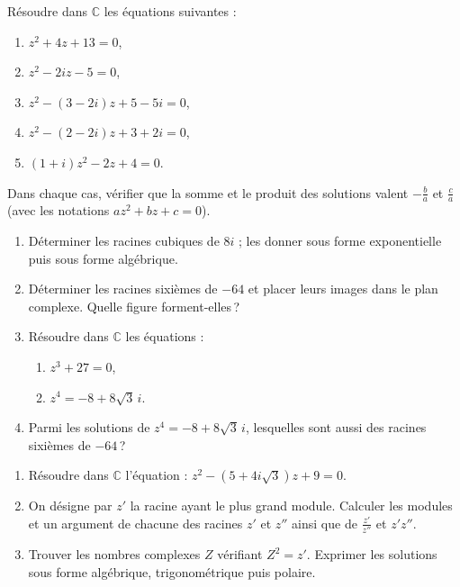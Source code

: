 \begin{exo}
	R\'esoudre dans $\mathbb{C}$ les \'equations suivantes :
	\begin{enumerate}
		\item $z^2 + 4z + 13 = 0$,
		\item $z^2 - 2iz - 5 = 0$,
		\item $z^2 - (3 - 2i) z + 5 - 5i = 0$,
		\item $z^2 - (2 - 2i) z + 3 + 2i = 0$,
		\item $(1+i) z^2 - 2z + 4 = 0$.
	\end{enumerate}
	Dans chaque cas, v\'erifier que la somme et le produit des solutions valent $-\frac{b}{a}$ et $\frac{c}{a}$ (avec les notations $az^2 + bz + c = 0$).
\end{exo}
%
\begin{exo}
	\begin{enumerate}
		\item D\'eterminer les racines cubiques de $8i$ ; les donner sous forme exponentielle puis sous forme alg\'ebrique.
		\item D\'eterminer les racines sixi\`emes de $-64$ et placer leurs images dans le plan complexe.
		      Quelle figure forment-elles\,?
		\item R\'esoudre dans $\mathbb{C}$ les \'equations :
			\begin{enumerate}
				\item $z^3 + 27 = 0$,
				\item $z^4 = -8 + 8\sqrt{3}\, i$.
			\end{enumerate}
		\item Parmi les solutions de $z^4 = -8 + 8\sqrt{3}\, i$, lesquelles sont aussi des racines sixi\`emes de $-64$\,?
	\end{enumerate}
\end{exo}
\begin{exo}
      \begin{enumerate}
            \item R\'esoudre dans $\mathbb{C}$ l'\'equation : $z^2 - (5+4i\sqrt{3}) z + 9 = 0$.
            \item On d\'esigne par $z'$ la racine ayant le plus grand module.
                  Calculer les modules et un argument de chacune des racines $z'$ et $z''$ 
                  ainsi que de $\frac{z'}{z''}$ et $z' z''$.
            \item Trouver les nombres complexes $Z$ v\'erifiant $Z^2 = z'$.
                  Exprimer les solutions sous forme alg\'ebrique, trigonom\'etrique puis polaire.
      \end{enumerate}
\end{exo}
